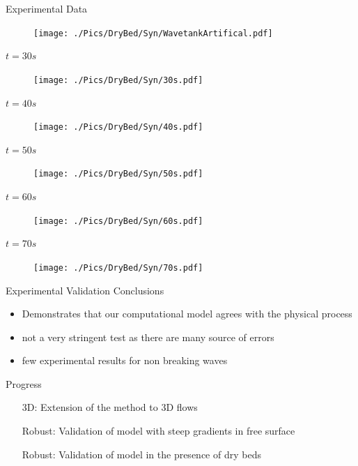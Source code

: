 \documentclass[pdf]{beamer}
\begin{document}
	
\begin{frame}{Experimental Data}
	\begin{figure}
		\texttt{[image: ./Pics/DryBed/Syn/WavetankArtifical.pdf]}
	\end{figure}
\end{frame}

\begin{frame}{$t=30s$}
	\begin{figure}
		\texttt{[image: ./Pics/DryBed/Syn/30s.pdf]}
	\end{figure}
\end{frame}

\begin{frame}{$t=40s$}
	\begin{figure}
		\texttt{[image: ./Pics/DryBed/Syn/40s.pdf]}
	\end{figure}
\end{frame}

\begin{frame}{$t=50s$}
	\begin{figure}
		\texttt{[image: ./Pics/DryBed/Syn/50s.pdf]}
	\end{figure}
\end{frame}

\begin{frame}{$t=60s$}
	\begin{figure}
		\texttt{[image: ./Pics/DryBed/Syn/60s.pdf]}
	\end{figure}
\end{frame}

\begin{frame}{$t=70s$}
	\begin{figure}
		\texttt{[image: ./Pics/DryBed/Syn/70s.pdf]}
	\end{figure}
\end{frame}
\begin{frame}{Experimental Validation Conclusions}
	\begin{itemize}
		\item Demonstrates that our computational model agrees with the physical process
		\item not a very stringent test as there are many source of errors
		\item few experimental results for non breaking waves
	\end{itemize}
\end{frame}

\begin{frame}{Progress}
	\begin{itemize}
		\item[3D:] Extension of the method to 3D flows  \checkmark
		\item[Robust:] Validation of model with steep gradients in free surface \checkmark 
		\item[Robust:] Validation of model in the presence of dry beds \checkmark
	\end{itemize}
\end{frame}
\end{document}
